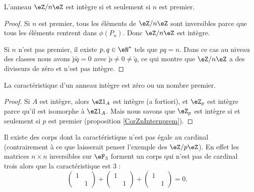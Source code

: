 \begin{corollary}   \label{CorZnInternprem}
    L'anneau \( \eZ/n\eZ\) est intègre si et seulement si \( n\) est premier.
\end{corollary}

\begin{proof}
    Si \( n\) est premier, tous les éléments de \( \eZ/n\eZ\) sont inversibles parce que tous les éléments rentrent dans \( \phi(P_n)\). Donc \( \eZ/n\eZ\) est intègre.

    Si \( n\) n'est pas premier, il existe \( p,q\in\eN^*\) tels que \( pq=n\). Dans ce cas au niveau des classes nous avons \( \tilde p\tilde q=0\) avec \( \tilde p\neq 0\neq\tilde q\), ce qui montre que \( \eZ/n\eZ\) a des diviseurs de zéro et n'est pas intègre.
\end{proof}


\begin{lemma}       \label{LemCaractIntergernbrcartpre}
    La caractéristique d'un anneau intègre est zéro ou un nombre premier.
\end{lemma}

\begin{proof}
    Si \( A\) est intègre, alors \( \eZ 1_A\) est intègre (a fortiori), et \( \eZ_p\) est intègre parce qu'il est isomorphe à \( \eZ 1_A\). Mais nous savons que \( \eZ_p\) est intègre si et seulement si \( p\) est premier (proposition \ref{CorZnInternprem}).
\end{proof}

\begin{example}
    Il existe des corps dont la caractéristique n'est pas égale au cardinal (contrairement à ce que laisserait penser l'exemple des \( \eZ/p\eZ\)). En effet les matrices \( n\times n\) inversibles sur \( \eF_{3}\) forment un corps qui n'est pas de cardinal trois alors que la caractéristique est \( 3\) :
    \begin{equation}
        \begin{pmatrix}
            1    &       \\ 
                &   1    
            \end{pmatrix}+\begin{pmatrix}
                1    &       \\ 
                    &   1    
                \end{pmatrix}+\begin{pmatrix}
                    1    &       \\ 
                        &   1    
                \end{pmatrix}=0.
    \end{equation}
\end{example}

